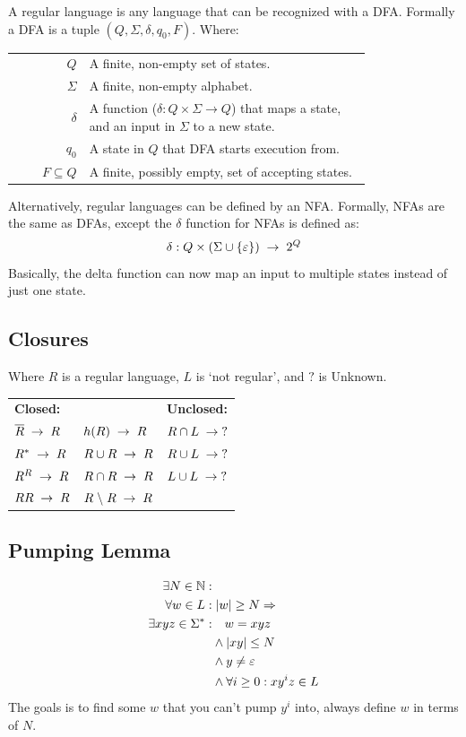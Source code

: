 A regular language is any language that can be recognized with a DFA.
Formally a DFA is a tuple $(Q,\Sigma,\delta,q_0,F)$. Where:

\begin{tabular}{rp{0.79\linewidth}}
$Q$             & A finite, non-empty set of states. \\
$\Sigma$        & A finite, non-empty alphabet. \\
$\delta$        & A function ($\delta : Q \times \Sigma \to Q$) that maps
                  a state, and an input in $\Sigma$ to a new state. \\
$q_0$           & A state in $Q$ that DFA starts execution from. \\
$F \subseteq Q$ & A finite, possibly empty, set of accepting states.
\end{tabular}
Alternatively, regular languages can be defined by an NFA. Formally, NFAs are
the same as DFAs, except the $\delta$ function for NFAs is defined as:
\[
    \delta : Q \times (\Sigma \cup \{\varepsilon\}) \;\to\; 2^Q
\]
Basically, the delta function can
now map an input to multiple states instead of just one state.

\subsection{Closures}
Where $R$ is a regular language, $L$ is `not regular', and $?$ is Unknown.

\settowidth{\templength}{$R \cap R \spto R$}
\addtolength{\templength}{1cm}
\begin{tabular}{lp{\templength}l}
\textbf{Closed:}       &                    & \textbf{Unclosed:} \\
$\overline{R} \;\to\; R$ & $h(R) \;\to\; R$     & $R \cap L \;\to\; ?$ \\
$R^* \;\to\; R$          & $R \cup R \;\to\; R$ & $R \cup L \;\to\; ?$\\
$R^R \;\to\; R$          & $R \cap R \spto R$ & $L \cup L \;\to\; ?$\\
$RR \;\to\; R$           & $R \;\backslash\; R \;\to\; R$ & \\
\end{tabular}

\subsection{Pumping Lemma}
\begin{align*}
\exists N \in \mathbb{N}: & \\
         \forall w \in L: &\; |w| \geq N \Rightarrow \\
\exists xyz \in \Sigma^*: & \quad w = xyz \\
                          & \land |xy| \leq N \\
                          & \land y \neq \varepsilon \\
                          & \land \forall i \geq 0: xy^iz \in L
\end{align*}
The goals is to find some $w$ that you can't pump $y^i$ into, always define $w$
in terms of $N$.
